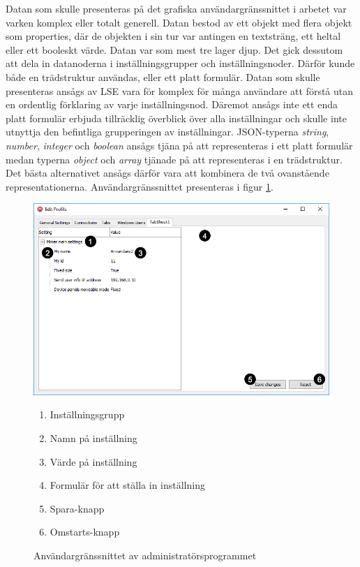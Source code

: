 Datan som skulle presenteras på det grafiska användargränssnittet i arbetet var varken komplex eller totalt generell. Datan bestod av ett objekt med flera objekt som properties, där de objekten i sin tur var antingen en textsträng, ett heltal eller ett booleskt värde. Datan var som mest tre lager djup. Det gick dessutom att dela in datanoderna i inställningsgrupper och inställningsnoder. Därför kunde både en trädstruktur användas, eller ett platt formulär. Datan som skulle presenteras ansågs av LSE vara för komplex för många användare att förstå utan en ordentlig förklaring av varje inställningsnod. Däremot ansågs inte ett enda platt formulär erbjuda tillräcklig överblick över alla inställningar och skulle inte utnyttja den befintliga grupperingen av inställningar. JSON-typerna \textit{string}, \textit{number}, \textit{integer} och \textit{boolean} ansågs tjäna på att representeras i ett platt formulär medan typerna \textit{object} och \textit{array} tjänade på att representeras i en trädstruktur. Det bästa alternativet ansågs därför vara att kombinera de två ovanstående representationerna. Användargränssnittet presenteras i figur \ref{fig:gui:helhet}.

\begin{figure}
	\includegraphics[width=\textwidth]{./images/gui/helhet.png}
	\vspace{-1.7em}
	\caption{Användargränssnittet av administratörsprogrammet}
	\label{fig:gui:helhet}
	\begin{enumerate}[noitemsep]
		\item Inställningsgrupp
		\item Namn på inställning
		\item Värde på inställning
		\item Formulär för att ställa in inställning
		\item Spara-knapp
		\item Omstarts-knapp
	\end{enumerate}
\end{figure}

